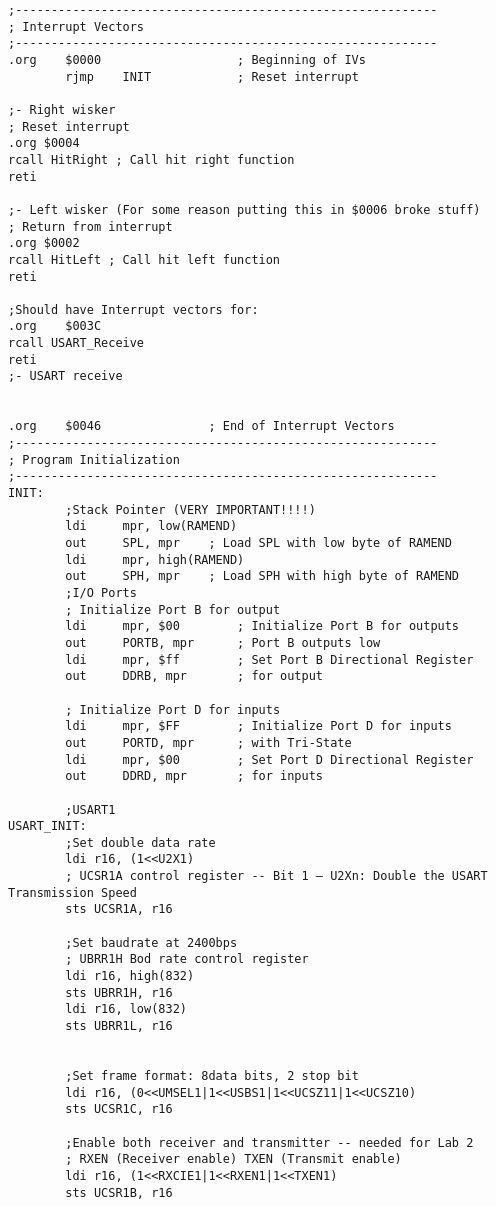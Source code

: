 \documentclass[12pt,letterpaper]{article}
\begin{document}
\begin{verbatim}
;-----------------------------------------------------------
; Interrupt Vectors
;-----------------------------------------------------------
.org	$0000					; Beginning of IVs
		rjmp 	INIT			; Reset interrupt

;- Right wisker
; Reset interrupt
.org $0004
rcall HitRight ; Call hit right function
reti

;- Left wisker (For some reason putting this in $0006 broke stuff)
; Return from interrupt
.org $0002
rcall HitLeft ; Call hit left function
reti

;Should have Interrupt vectors for:
.org    $003C
rcall USART_Receive
reti
;- USART receive


.org	$0046				; End of Interrupt Vectors
;-----------------------------------------------------------
; Program Initialization
;-----------------------------------------------------------
INIT:
        ;Stack Pointer (VERY IMPORTANT!!!!)
        ldi     mpr, low(RAMEND)
        out     SPL, mpr    ; Load SPL with low byte of RAMEND
        ldi     mpr, high(RAMEND)
        out     SPH, mpr    ; Load SPH with high byte of RAMEND
        ;I/O Ports
        ; Initialize Port B for output
        ldi     mpr, $00        ; Initialize Port B for outputs
        out     PORTB, mpr      ; Port B outputs low
        ldi     mpr, $ff        ; Set Port B Directional Register
        out     DDRB, mpr       ; for output

        ; Initialize Port D for inputs
        ldi     mpr, $FF        ; Initialize Port D for inputs
        out     PORTD, mpr      ; with Tri-State
        ldi     mpr, $00        ; Set Port D Directional Register
        out     DDRD, mpr       ; for inputs

        ;USART1
USART_INIT:
        ;Set double data rate
        ldi r16, (1<<U2X1)
        ; UCSR1A control register -- Bit 1 – U2Xn: Double the USART Transmission Speed
        sts UCSR1A, r16

        ;Set baudrate at 2400bps
        ; UBRR1H Bod rate control register
        ldi r16, high(832)
        sts UBRR1H, r16
        ldi r16, low(832)
        sts UBRR1L, r16


		;Set frame format: 8data bits, 2 stop bit
        ldi r16, (0<<UMSEL1|1<<USBS1|1<<UCSZ11|1<<UCSZ10)
        sts UCSR1C, r16

        ;Enable both receiver and transmitter -- needed for Lab 2
        ; RXEN (Receiver enable) TXEN (Transmit enable)
        ldi r16, (1<<RXCIE1|1<<RXEN1|1<<TXEN1) 
        sts UCSR1B, r16


\end{verbatim}
\end{document}
